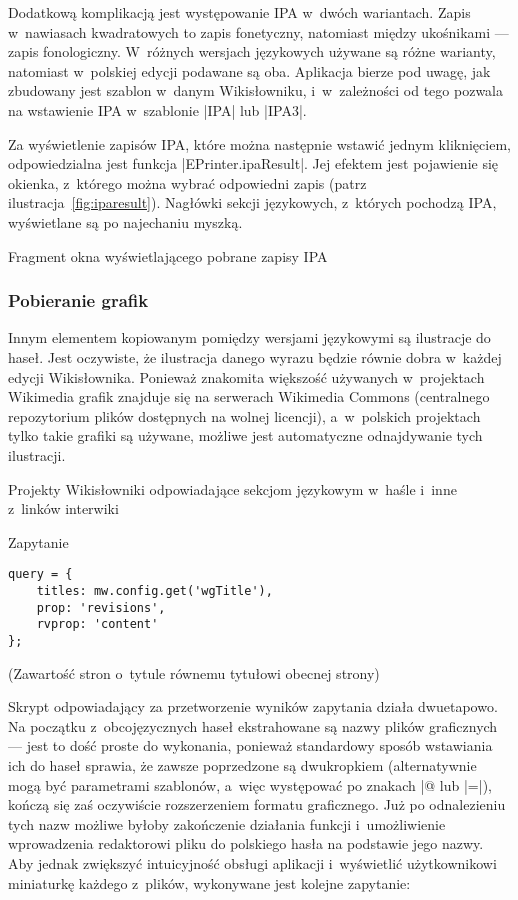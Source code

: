 Dodatkową komplikacją jest występowanie IPA w~dwóch wariantach. Zapis w~nawiasach kwadratowych to zapis fonetyczny, natomiast między ukośnikami --- zapis fonologiczny. W~różnych wersjach językowych używane są różne warianty, natomiast w~polskiej edycji podawane są oba. Aplikacja bierze pod uwagę, jak zbudowany jest szablon w~danym Wikisłowniku, i~w~zależności od tego pozwala na wstawienie IPA w~szablonie \kod|{{IPA}}| lub \kod|{{IPA3}}|.

Za wyświetlenie zapisów IPA, które można następnie wstawić jednym kliknięciem, odpowiedzialna jest funkcja \kod|EPrinter.ipaResult|. Jej efektem jest pojawienie się okienka, z~którego można wybrać odpowiedni zapis (patrz ilustracja~\ref{fig:iparesult}). Nagłówki sekcji językowych, z~których pochodzą IPA, wyświetlane są po najechaniu myszką.

\begin{illustration}
	\caption{Fragment okna wyświetlającego pobrane zapisy IPA}
	\label{fig:iparesult}
\end{illustration}

\subsubsection{Pobieranie grafik}
Innym elementem kopiowanym pomiędzy wersjami językowymi są ilustracje do haseł. Jest oczywiste, że ilustracja danego wyrazu będzie równie dobra w~każdej edycji Wikisłownika. Ponieważ znakomita większość używanych w~projektach Wikimedia grafik znajduje się na serwerach Wikimedia Commons (centralnego repozytorium plików dostępnych na wolnej licencji), a~w~polskich projektach tylko takie grafiki są używane, możliwe jest automatyczne odnajdywanie tych ilustracji.

\begin{opis}
\item[Projekty] Wikisłowniki odpowiadające sekcjom językowym w~haśle i~inne z~linków interwiki
\item[Zapytanie]
\begin{verbatim}
query = {
    titles: mw.config.get('wgTitle'),
    prop: 'revisions',
    rvprop: 'content'
};
\end{verbatim}
(Zawartość stron o~tytule równemu tytułowi obecnej strony)
\end{opis}

Skrypt odpowiadający za przetworzenie wyników zapytania działa dwuetapowo. Na początku z~obcojęzycznych haseł ekstrahowane są nazwy plików graficznych --- jest to dość proste do wykonania, ponieważ standardowy sposób wstawiania ich do haseł sprawia, że zawsze poprzedzone są dwukropkiem (alternatywnie mogą być parametrami szablonów, a~więc występować po znakach \kod@|@ lub \kod|=|), kończą się zaś oczywiście rozszerzeniem formatu graficznego. Już po odnalezieniu tych nazw możliwe byłoby zakończenie działania funkcji i~umożliwienie wprowadzenia redaktorowi pliku do polskiego hasła na podstawie jego nazwy. Aby jednak zwiększyć intuicyjność obsługi aplikacji i~wyświetlić użytkownikowi miniaturkę każdego z~plików, wykonywane jest kolejne zapytanie:

